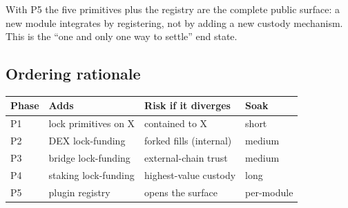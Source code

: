 \noindent With P5 the five primitives plus the registry are the complete
public surface: a new module integrates by registering, not by adding a
new custody mechanism. This is the ``one and only one way to settle''
end state.

\subsection*{Ordering rationale}

\begin{center}
\begin{tabular}{@{}llll@{}}
\toprule
Phase & Adds & Risk if it diverges & Soak \\
\midrule
P1 & lock primitives on X      & contained to X            & short \\
P2 & DEX lock-funding          & forked fills (internal)   & medium \\
P3 & bridge lock-funding       & external-chain trust      & medium \\
P4 & staking lock-funding      & highest-value custody     & long \\
P5 & plugin registry           & opens the surface         & per-module \\
\bottomrule
\end{tabular}
\end{center}
